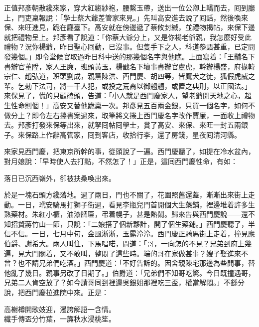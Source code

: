 正值邦彥朝散纔來家，穿大紅縐紗袍，腰繫玉帶，送出一位公卿上轎而去，囘到廳上，門吏稟報說：「學士蔡大爺差管家來見。」先叫高安進去說了囘話，然後喚來保、來旺進見，跪在廳臺下。高安就在傍邊遞了蔡攸封緘，並禮物揭帖，來保下邊就把禮物呈上。邦彥看了說道：「你蔡大爺分上，又是你楊老爺親，我怎麼好受此禮物？況你楊爺，昨日聖心囘動，已沒事。但隻手下之人，科道叅語甚重，已定問發幾個。」即令堂候官取過昨日科中送的那幾個名字與他瞧。上面寫着：「王黼名下書辦官董陞，家人王廉，班頭黃玉，楊戩名下壞事書辦官盧虎，幹辦楊盛，府掾韓宗仁、趙弘道，班頭劉成，親黨陳洪、西門慶、胡四等，皆鷹犬之徒，狐假虎威之輩。乞勑下法司，將一干人犯，或投之荒裔以御魍魎，或置之典刑，以正國法。」來保見了，慌的只顧磕頭，告道：「小人就是西門慶家人，望老爺開天地之心，超生性命則個！」高安又替他跪稟一次。邦彥見五百兩金銀，只買一個名字，如何不做分上？即令左右擡書案過來，取筆將文捲上西門慶名字改作賈廉，{}一面收上禮物去。邦彥打發來保等出來，就拏囘帖囘學士，賞了高安、來保、來旺一封五兩銀子。來保路上作辭高管家，囘到客店，收拾行李，還了房錢，星夜囘清河縣。

來家見西門慶，把東京所幹的事，從頭說了一遍。西門慶聽了，如提在冷水盆內，對月娘說：「早時使人去打點，不然怎了！」正是，這囘西門慶性命，有如：

\begin{myquote}
落日已沉西嶺外，卻被扶桑喚出來。
\end{myquote}

於是一塊石頭方纔落地。過了兩日，門也不關了，花園照舊還蓋，漸漸出來街上走動。{}一日，玳安騎馬打獅子街過，看見李瓶兒門首開個大生藥鋪，裡邊堆着許多生熟藥材。朱紅小櫃，油漆牌匾，弔着幌子，甚是熱鬧。歸來告與西門慶說——還不知招贅蔣竹山一節，只說：「二娘搭了個新夥計，開了個生藥鋪。」{}西門慶聽了，半信不信。一日，七月中旬，金風淅淅，玉露泠泠。西門慶正騎馬街上走着，撞見應伯爵、謝希大。兩人叫住，下馬唱喏，問道：「哥，一向怎的不見？兄弟到府上幾遍，見大門關着，又不敢叫，整悶了這些時。端的哥在家做甚事？嫂子娶進來不曾？也不請兄弟們吃酒。」西門慶道：「不好告訴的。因舍親陳宅那邊為些閒事，替他亂了幾日。親事另改了日期了。」伯爵道：「兄弟們不知哥吃驚。今日既撞遇哥，兄弟二人肯空放了？如今請哥同到裡邊吳銀姐那裡吃三盃，權當解悶。」不繇分說，把西門慶拉進院中來。正是：

\begin{myquote}
高榭樽開歌妓迎，漫誇解語一含情。\\纖手傳盃分竹葉，一簾秋水浸桃笙。
\end{myquote}

